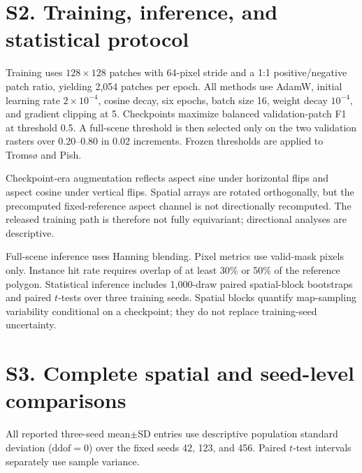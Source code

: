 \documentclass[11pt,a4paper]{article}
\begin{document}
\section*{S2. Training, inference, and statistical protocol}

Training uses $128\times128$ patches with 64-pixel stride and a 1:1 positive/negative patch ratio, yielding 2,054 patches per epoch. All methods use AdamW, initial learning rate $2\times10^{-4}$, cosine decay, six epochs, batch size 16, weight decay $10^{-4}$, and gradient clipping at 5. Checkpoints maximize balanced validation-patch F1 at threshold 0.5. A full-scene threshold is then selected only on the two validation rasters over 0.20--0.80 in 0.02 increments. Frozen thresholds are applied to Troms{\o} and Pish.

Checkpoint-era augmentation reflects aspect sine under horizontal flips and aspect cosine under vertical flips. Spatial arrays are rotated orthogonally, but the precomputed fixed-reference aspect channel is not directionally recomputed. The released training path is therefore not fully equivariant; directional analyses are descriptive.

Full-scene inference uses Hanning blending. Pixel metrics use valid-mask pixels only. Instance hit rate requires overlap of at least 30\% or 50\% of the reference polygon. Statistical inference includes 1,000-draw paired spatial-block bootstraps and paired $t$-tests over three training seeds. Spatial blocks quantify map-sampling variability conditional on a checkpoint; they do not replace training-seed uncertainty.

\section*{S3. Complete spatial and seed-level comparisons}

All reported three-seed mean$\pm$SD entries use descriptive population standard deviation ($\mathrm{ddof}=0$) over the fixed seeds 42, 123, and 456. Paired $t$-test intervals separately use sample variance.
\end{document}
